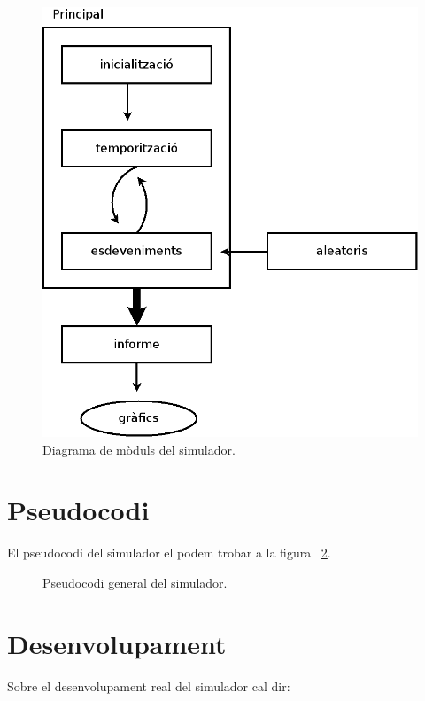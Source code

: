 \begin{figure}
  \centering
  \includegraphics[width=\textwidth]{img/diagrama-moduls.png}
  \caption{Diagrama de mòduls del simulador.}
  \label{sim:fig:diagrama-moduls}
\end{figure}

\section{Pseudocodi}

El pseudocodi del simulador el podem trobar a la figura
~\ref{sim:codi:pseudocodi}.

\begin{figure}
  \centering
  \caption{Pseudocodi general del simulador.}
  \label{sim:codi:pseudocodi}
\end{figure}


\section{Desenvolupament}

Sobre el desenvolupament real del simulador cal dir:

